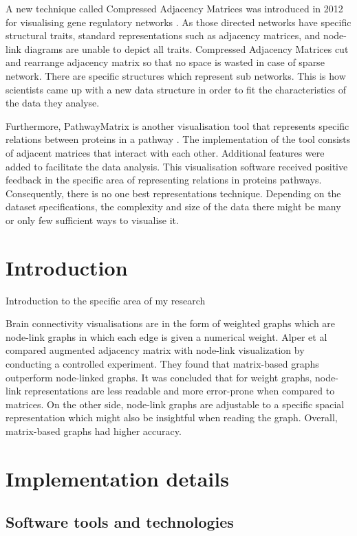 \documentclass{l4proj}
\begin{document}
A new technique called Compressed Adjacency Matrices was introduced in 2012 for visualising gene regulatory networks \cite{dinkla2012compressed}. As those directed networks have specific structural traits, standard representations such as adjacency matrices, and node-link diagrams are unable to depict all traits. Compressed Adjacency Matrices cut and rearrange adjacency matrix so that no space is wasted in case of sparse network. There are specific structures which represent sub networks. This is how scientists came up with a new data structure in order to fit the characteristics of the data they analyse.

Furthermore, PathwayMatrix is another visualisation tool that represents specific relations between proteins in a pathway \cite{dang2015pathwaymatrix}. The implementation of the tool consists of adjacent matrices that interact with each other. Additional features were added to facilitate the data analysis. This visualisation software received positive feedback in the specific area of representing relations in proteins pathways. Consequently, there is no one best representations technique. Depending on the dataset specifications, the complexity and size of the data there might be many or only few sufficient ways to visualise it.       

\chapter{Introduction}
Introduction to the specific area of my research

Brain connectivity visualisations are in the form of weighted graphs which are node-link graphs in which each edge is given a numerical weight. Alper et al \cite{alper2013weighted} compared augmented adjacency matrix with node-link visualization by conducting a controlled experiment. They found that matrix-based graphs outperform node-linked graphs. It was concluded that for weight graphs, node-link representations are less readable and more error-prone when compared to matrices. On the other side, node-link graphs are adjustable to a specific spacial representation which might also be insightful when reading the graph. Overall, matrix-based graphs had higher accuracy.  

\chapter{Implementation details}

\section{Software tools and technologies}
\end{document}
